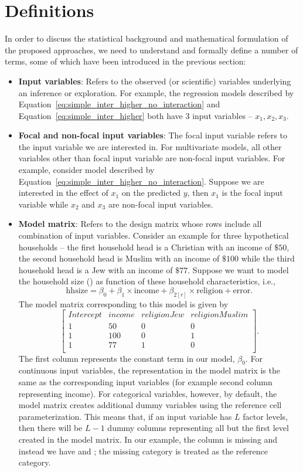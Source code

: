 \section{Definitions}

In order to discuss the statistical background and mathematical formulation of the proposed approaches, we need to understand and formally define a number of terms, some of which have been introduced in the previous section:

\begin{itemize}
\item \textbf{Input variables}: Refers to the observed (or scientific) variables underlying an inference or exploration. For example, the regression models described by Equation~\ref{eq:simple_inter_higher_no_interaction} and Equation~\ref{eq:simple_inter_higher} both have $3$ input variables -- $x_1, x_2, x_3$.
\item \textbf{Focal and non-focal input variables}: The focal input variable refers to the input variable we are interested in. For multivariate models, all other variables other than focal input variable are non-focal input variables. For example, consider model described by Equation~\ref{eq:simple_inter_higher_no_interaction}. Suppose we are interested in the effect of $x_1$ on the predicted $y$, then $x_1$ is the focal input variable while $x_2$ and $x_3$ are non-focal input variables.
\item \textbf{Model matrix}: Refers to the design matrix whose rows include all combination of input variables. Consider an example for three hypothetical households -- the first household head is a Christian with an income of $\$ 50$, the second household head is Muslim with an income of $\$ 100$ while the third household head is a Jew with an income of $\$ 77$. Suppose we want to model the household size () as function of these household characteristics, i.e., $$\mathrm{hhsize} = \beta_0 + \beta_1\times\mathrm{income} + \beta_{2[r]}\times\mathrm{religion} + \mathrm{error}.$$ The model matrix corresponding to this model is given by
$$\begin{bmatrix}{}
 Intercept & income & religionJew & religionMuslim \\
 1 & 50 & 0 & 0 \\
  1 & 100 & 0 & 1 \\
  1 & 77 & 1 & 0 \\
\end{bmatrix}.$$ The first column represents the constant term in our model, $\beta_0$. For continuous input variables, the representation in the model matrix is the same as the corresponding input variables (for example second column representing income). For categorical variables, however, by default, the model matrix  creates additional dummy variables using the reference cell parameterization. This means that, if an input variable has $L$ factor levels, then there will be $L-1$ dummy columns representing all but the first level created in the model matrix. In our example, the column  is missing and instead we have  and ; the missing category  is treated as the reference category.

\end{itemize}
